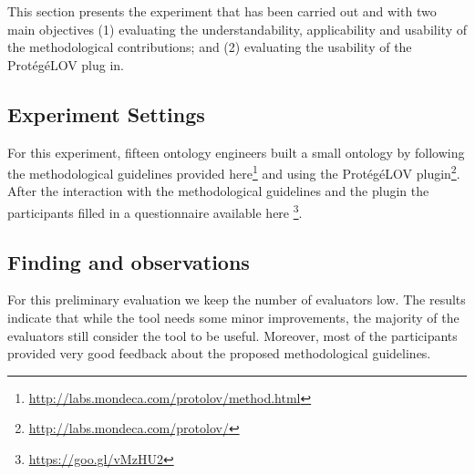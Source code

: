 This section presents the experiment that has been carried out and with two main objectives (1)  evaluating the understandability, applicability and usability of the methodological contributions; and (2) evaluating the usability of the Prot{\'e}g{\'e}LOV plug in.
\vspace{1mm}
\subsection{Experiment Settings}
For this experiment, fifteen ontology engineers built a small ontology by following the methodological guidelines provided here\footnote{\url{http://labs.mondeca.com/protolov/method.html}} and using the Prot{\'e}g{\'e}LOV plugin\footnote{\url{http://labs.mondeca.com/protolov/}}. After the interaction with the methodological guidelines and the plugin the participants filled in a questionnaire available here \footnote{\url{https://goo.gl/vMzHU2}}.
\vspace{1mm}
\subsection{Finding and observations}
For this preliminary evaluation we keep the number of evaluators low. The results indicate that while the tool needs some minor improvements, the majority of the evaluators still consider the tool to be useful. Moreover, most of the participants provided very good feedback about the proposed methodological guidelines.


 

\begin{comment}
\subsection{Other evaluation?}

We have conducted an initial user driven evaluation of the tool. For this preliminary evaluation we keep the number of evaluators low; seven ontology engineers used our plugin and gave us an insight on their experience by filling in a questionnaire \footnote{\url{http://goo.gl/H4YgBJ}}. The results indicate that while the tool needs some minor improvements, the majority of the evaluators still consider the tool to be useful.
\end{comment}
\vspace{3mm}
